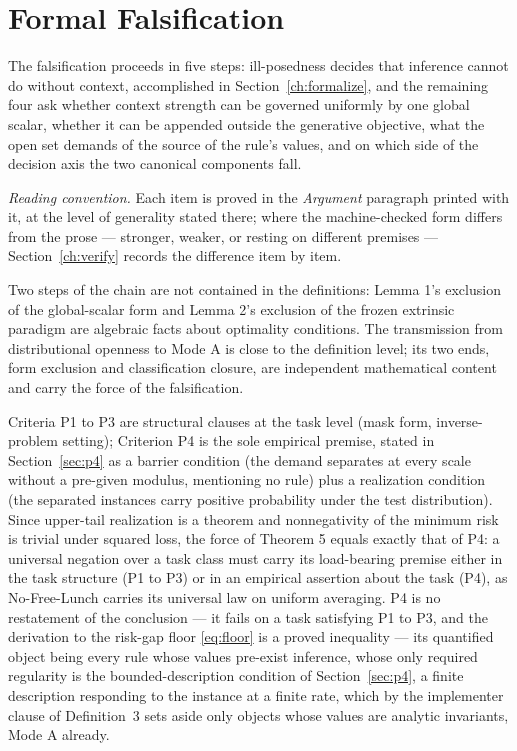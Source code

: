 \section{Formal Falsification}
\label{ch:falsify}

The falsification proceeds in five steps: ill-posedness decides that inference cannot do without context, accomplished in Section~\ref{ch:formalize}, and the remaining four ask whether context strength can be governed uniformly by one global scalar, whether it can be appended outside the generative objective, what the open set demands of the source of the rule's values, and on which side of the decision axis the two canonical components fall.

\emph{Reading convention.} Each item is proved in the \emph{Argument} paragraph printed with it, at the level of generality stated there; where the machine-checked form differs from the prose --- stronger, weaker, or resting on different premises --- Section~\ref{ch:verify} records the difference item by item.

Two steps of the chain are not contained in the definitions: Lemma 1's exclusion of the global-scalar form and Lemma 2's exclusion of the frozen extrinsic paradigm are algebraic facts about optimality conditions. The transmission from distributional openness to Mode A is close to the definition level; its two ends, form exclusion and classification closure, are independent mathematical content and carry the force of the falsification.

Criteria P1 to P3 are structural clauses at the task level (mask form, inverse-problem setting); Criterion P4 is the sole empirical premise, stated in Section~\ref{sec:p4} as a barrier condition (the demand separates at every scale without a pre-given modulus, mentioning no rule) plus a realization condition (the separated instances carry positive probability under the test distribution). Since upper-tail realization is a theorem and nonnegativity of the minimum risk is trivial under squared loss, the force of Theorem 5 equals exactly that of P4: a universal negation over a task class must carry its load-bearing premise either in the task structure (P1 to P3) or in an empirical assertion about the task (P4), as No-Free-Lunch carries its universal law on uniform averaging. P4 is no restatement of the conclusion --- it fails on a task satisfying P1 to P3, and the derivation to the risk-gap floor \eqref{eq:floor} is a proved inequality --- its quantified object being every rule whose values pre-exist inference, whose only required regularity is the bounded-description condition of Section~\ref{sec:p4}, a finite description responding to the instance at a finite rate, which by the implementer clause of Definition~3 sets aside only objects whose values are analytic invariants, Mode A already.

